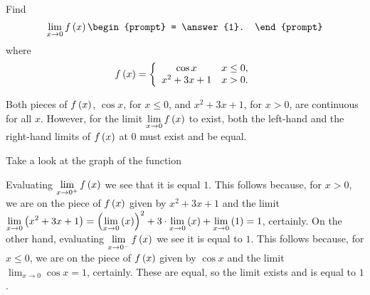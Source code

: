 \documentclass{ximera}
\author{Gregory Hartman \and Matthew Carr}
\begin{document}
\begin{exercise}



  Find 
  \[
  \lim_{x\to 0} f\p{x}
  \begin{prompt}
  = \answer{1}.
  \end{prompt}
  \]
  where
  \[
  f\left(x\right) = \left\{\begin{array}{cl} \cos x & x\leq 0, \\ x^2+3x+1 & x>0. \end{array}\right.
  \]
    \begin{hint}
     Both pieces of $f\left(x\right)$, $\cos x$, for $x\leq0$, and $x^2+3x+1$, for $x>0$, are continuous for all $x$. However, for the limit $\lim_{x\to0}f\p{x}$ to exist, both the left-hand and the right-hand limits of $f\left(x\right)$ at $0$ must exist and be equal.
    \end{hint}
     \begin{hint}
    	Take a look at the graph of the function
    \begin{center}
      \end{center} 
    \end{hint}
    \begin{hint}
     Evaluating $\lim_{x\to0^{+}}f\p{x}$ we see that it is equal $1$. This follows because, for $x>0$, we are on the piece of $f\left(x\right)$ given by $x^2+3x+1$ and the limit $\lim_{x\to0}\p{x^2+3x+1}=\p{\lim_{x\to0}\p{x}}^2+3\cdot\lim_{x\to0}\p{x}+\lim_{x\to0}\p{1}=1$, certainly. On the other hand, evaluating $\lim_{x\to0^{-}}f\p{x}$ we see it is equal to $1$. This follows because, for $x\leq0$, we are on the piece of $f\left(x\right)$ given by $\cos x$ and the limit $\lim_{x\to0}\cos x=1$, certainly. These are equal, so the limit exists and is equal to $1$.
    \end{hint}
\end{exercise}
\end{document}
